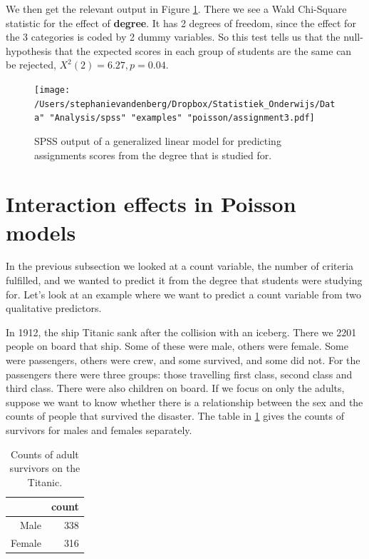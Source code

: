 \documentclass[]{report}\usepackage[]{graphicx}\usepackage[]{color}
\begin{document}
We then get the relevant output in Figure \ref{fig:assignment3}. There we see a Wald Chi-Square statistic for the effect of \textbf{degree}. It has 2 degrees of freedom, since the effect for the 3 categories is coded by 2 dummy variables. So this test tells us that the null-hypothesis that the expected scores in each group of students are the same can be rejected, $X^2(2)=6.27, p=0.04$.


\begin{figure}[h]
    \begin{center}
       \texttt{[image: /Users/stephanievandenberg/Dropbox/Statistiek\_Onderwijs/Data" "Analysis/spss" "examples" "poisson/assignment3.pdf]}
    \end{center}
     \caption{SPSS output of a generalized linear model for predicting assignments scores from the degree that is studied for.}
    \label{fig:assignment3}
\end{figure}


\section{Interaction effects in Poisson models}

In the previous subsection we looked at a count variable, the number of criteria fulfilled, and we wanted to predict it from the degree that students were studying for. Let's look at an example where we want to predict a count variable from two qualitative predictors.

In 1912, the ship Titanic sank after the collision with an iceberg. There we 2201 people on board that ship. Some of these were male, others were female. Some were passengers, others were crew, and some survived, and some did not. For the passengers there were three groups: those travelling first class, second class and third class. There were also children on board. If we focus on only the adults, suppose we want to know whether there is a relationship between the sex and the counts of people that survived the disaster. The table in \ref{tab:gen_20} gives the counts of survivors for males and females separately.


\begin{table}[ht]
\centering
\caption{Counts of adult survivors on the Titanic.} 
\label{tab:gen_20}
\begin{tabular}{rr}
  \hline
 & count \\ 
  \hline
Male & 338 \\ 
  Female & 316 \\ 
   \hline
\end{tabular}
\end{table}
\end{document}
